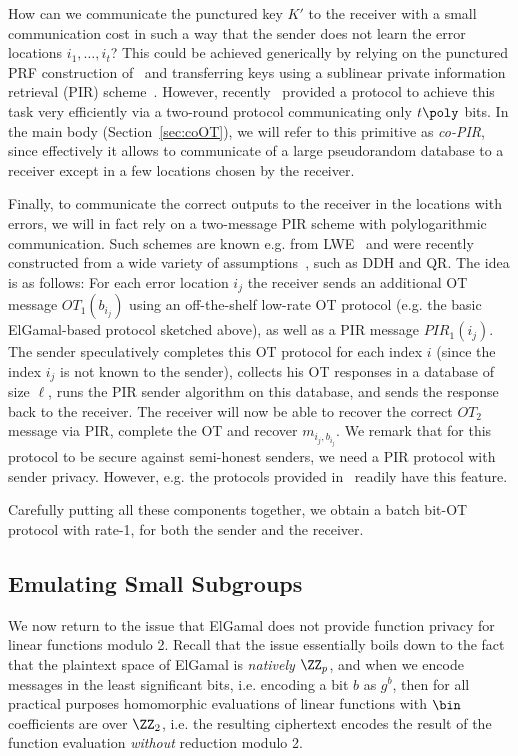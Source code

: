How can we communicate the punctured key $K'$ to the receiver with a small communication cost in such a way that the sender does not learn the error locations $i_1,\dots,i_t$? This could be achieved generically by relying on the punctured PRF construction of~\cite{PKC:BoyGolIva14} and transferring keys using a sublinear private information retrieval (PIR) scheme~\cite{FOCS:CGKS95,C:DGIMMO19}. However, recently~\cite{C:BCGIKS19} provided a protocol to achieve this task very efficiently via a two-round protocol communicating only $t \poly$ bits. In the main body (Section~\ref{sec:coOT}), we will refer to this primitive as \emph{co-PIR}, since effectively it allows to communicate of a large pseudorandom database to a receiver except in a few locations chosen by the receiver.

Finally, to communicate the correct outputs to the receiver in the locations with errors, we will in fact rely on a two-message PIR scheme with polylogarithmic communication. Such schemes are known e.g. from LWE~\cite{FOCS:BraVai11} and were recently constructed from a wide variety of assumptions~\cite{C:DGIMMO19}, such as DDH and QR. The idea is as follows: For each error location $i_j$ the receiver sends an additional OT message $OT_1(b_{i_j})$ using an off-the-shelf low-rate OT protocol (e.g. the basic ElGamal-based protocol sketched above), as well as a PIR message ${PIR}_1(i_j)$. The sender speculatively completes this OT protocol for each index $i$ (since the index $i_j$ is not known to the sender), collects his OT responses in a database of size $\ell$, runs the PIR sender algorithm on this database, and sends the response back to the receiver. The receiver will now be able to recover the correct $OT_2$ message via PIR, complete the OT and recover $m_{i_j,b_{i_j}}$. We remark that for this protocol to be secure against semi-honest senders, we need a PIR protocol with sender privacy. However, e.g. the protocols provided in~\cite{C:DGIMMO19} readily have this feature.

Carefully putting all these components together, we obtain a batch bit-OT protocol with rate-1, for both the sender and the receiver.

\subsection{Emulating Small Subgroups}
We now return to the issue that ElGamal does not provide function privacy for linear functions modulo 2. Recall that the issue essentially boils down to the fact that the plaintext space of ElGamal is \emph{natively} $\ZZ_p$, and when we encode messages in the least significant bits, i.e. encoding a bit $b$ as $g^b$, then for all practical purposes homomorphic evaluations of linear functions with $\bin$ coefficients are over $\ZZ_2$, i.e. the resulting ciphertext encodes the result of the function evaluation \emph{without} reduction modulo 2.

